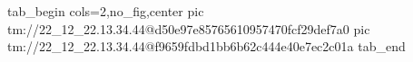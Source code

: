  
 
 
 
 

\qqSecOrig


\ifcmt
  tab_begin cols=2,no_fig,center
    pic tm://22_12_22.13.34.44@d50e97e85765610957470fcf29def7a0
    pic tm://22_12_22.13.34.44@f9659fdbd1bb6b62c444e40e7ec2c01a
  tab_end
\fi

